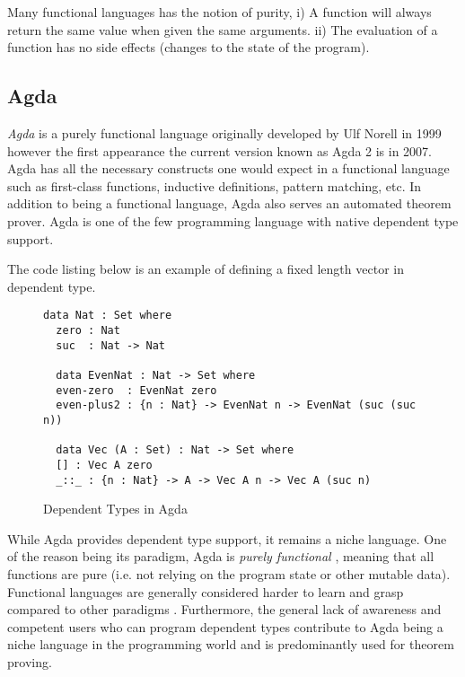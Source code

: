 \documentclass[a4paper,12pt]{report}
\begin{document}
\par

Many functional languages has the notion of purity, i) A function will always 
return the same value when given the same arguments. ii) The evaluation of a 
function has no side effects (changes to the state of the program).

\subsection{Agda}

\textit{Agda} \cite{agda} is a purely functional language originally developed by Ulf Norell in 
1999 however the first appearance the current version known as Agda 2 is in 
2007. Agda has all the necessary constructs one would expect in a functional 
language such as first-class functions, inductive definitions, pattern matching, 
etc. In addition to being a functional language, Agda also serves an automated theorem prover. 
Agda is one of the few programming language with native dependent type support. 

\par
The code listing below is an example of defining a fixed length vector in 
dependent type. 

\begin{figure}[H]
  \begin{lstlisting}[mathescape=true] 
  data Nat : Set where 
  zero : Nat
  suc  : Nat -> Nat  
  
  data EvenNat : Nat -> Set where
  even-zero  : EvenNat zero
  even-plus2 : {n : Nat} -> EvenNat n -> EvenNat (suc (suc n))
  
  data Vec (A : Set) : Nat -> Set where
  [] : Vec A zero
  _::_ : {n : Nat} -> A -> Vec A n -> Vec A (suc n)
  \end{lstlisting}
  \caption{Dependent Types in Agda}
\end{figure}

\par
While Agda provides dependent type support, it remains a niche language. One of 
the reason being its paradigm, Agda is \textit{purely functional} \cite{purelyFP}, meaning that 
all functions are pure (i.e. not relying on the program state or other mutable 
data). Functional languages are generally considered harder to learn and grasp 
compared to other paradigms \cite{fpHarder}. Furthermore, the general lack of 
awareness and competent users who can program dependent types contribute to Agda 
being a niche language in the programming world and is 
predominantly used for theorem proving.
\end{document}
